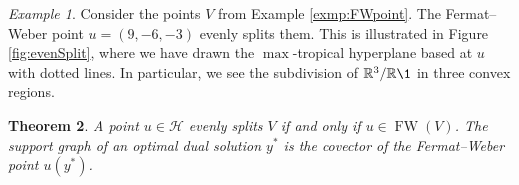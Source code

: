 \documentclass[a4paper,12pt]{amsart}
\newcommand\RR{{\mathbb R}}
\newcommand\cH{{\mathcal H}}
\newcommand\torus[1]{\RR^{#1}/\RR\1} %
\DeclareMathOperator{\FW}{FW} %
\newtheorem{theorem}{Theorem}
\theoremstyle{remark}
\newtheorem{example}[theorem]{Example}
\begin{document}
\begin{example} \label{exmp:evenSplit}
  Consider the points $V$ from Example \ref{exmp:FWpoint}.
  The Fermat--Weber point $u=(9,-6,-3)$ evenly splits them.
  This is illustrated in Figure \ref{fig:evenSplit}, where we have drawn the $\max$-tropical hyperplane based at $u$ with dotted lines.
  In particular, we see the subdivision of $\torus{3}$ in three convex regions.
\end{example}

\begin{theorem}\label{thm:FW-dual}
  A point $u\in\cH$ evenly splits $V$ if and only if $u\in\FW(V)$.
  The support graph of an optimal dual solution $y^*$ is the covector of the Fermat--Weber point $u(y^*)$.
\end{theorem}
\end{document}
